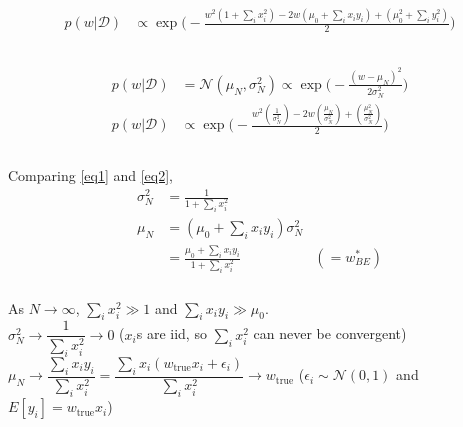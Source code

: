\documentclass[12pt, fleqn]{article}
\begin{document}
\subsubsection{}
\begin{equation}
  \begin{aligned}
    \label{eq1}
    p(w | \mathcal{D}) & \propto \exp \bigg( -\frac{w^2 (1 + \sum_i x_i^2) - 2w(\mu_0 + \sum_i x_i y_i) + (\mu_0^2 + \sum_i y_i^2)}{2} \bigg) \\
  \end{aligned}
\end{equation}

\subsubsection{}
\begin{equation}
  \begin{aligned}
    \label{eq2}
    p(w | \mathcal{D}) & = \mathcal{N}(\mu_N, \sigma_N^2) \propto \exp \bigg( -\frac{(w - \mu_N)^2}{2 \sigma_N^2} \bigg)                                 \\
    p(w | \mathcal{D}) & \propto \exp \bigg( -\frac{w^2 (\frac{1}{\sigma_N^2}) - 2w (\frac{\mu_N}{\sigma_N^2}) + (\frac{\mu_N^2}{\sigma_N^2})}{2} \bigg) \\
  \end{aligned}
\end{equation}

\subsubsection{}
Comparing \eqref{eq1} and \eqref{eq2}, \\
\begin{equation*}
  \begin{aligned}
    \sigma_N^2 & = \frac{1}{1 + \sum_i x_i^2}                                     \\
    \mu_N      & = (\mu_0 + \sum_i x_i y_i) \sigma_N^2                            \\
               & = \frac{\mu_0 + \sum_i x_i y_i}{1 + \sum_i x_i^2} & (= w^*_{BE})
  \end{aligned}
\end{equation*}

\subsubsection{}
As $N \to \infty$, $\sum_i x_i^2 \gg 1$ and $\sum_i x_i y_i \gg \mu_0$. \\
$\sigma_N^2 \to \dfrac{1}{\sum_i x_i^2} \to 0$ ($x_i$s are iid, so $\sum_i x_i^2$ can never be convergent)\\
$\mu_N \to \dfrac{\sum_i x_i y_i}{\sum_i x_i^2} = \dfrac{\sum_i x_i (w_{\text{true}} x_i + \epsilon_i)}{\sum_i x_i^2} \to w_{\text{true}}$ ($\epsilon_i \sim \mathcal{N}(0, 1)$ and $E[y_i] = w_{\text{true}} x_i$)
\end{document}
